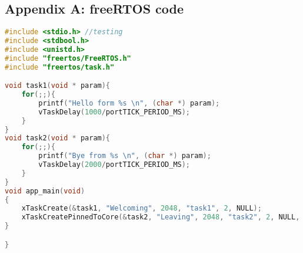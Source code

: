 \subsection*{Appendix A: freeRTOS code}
\begin{lstlisting}[language=C, caption={main.c}]
#include <stdio.h> //testing
#include <stdbool.h>
#include <unistd.h>
#include "freertos/FreeRTOS.h"
#include "freertos/task.h"

void task1(void * param){
	for(;;){
		printf("Hello form %s \n", (char *) param);
		vTaskDelay(1000/portTICK_PERIOD_MS);
	}
}
void task2(void * param){
	for(;;){
		printf("Bye from %s \n", (char *) param);
		vTaskDelay(2000/portTICK_PERIOD_MS);
	}
}
void app_main(void)
{
	xTaskCreate(&task1, "Welcoming", 2048, "task1", 2, NULL);
	xTaskCreatePinnedToCore(&task2, "Leaving", 2048, "task2", 2, NULL, 1);
}

}
\end{lstlisting}